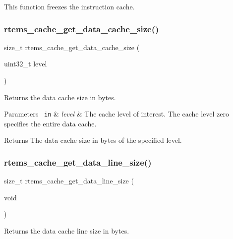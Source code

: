 This function freezes the instruction cache. \mbox{\label{group__ClassicCache_ga518a30758a99000e752ba02f04674749}} 
\subsubsection{\texorpdfstring{rtems\_cache\_get\_data\_cache\_size()}{rtems\_cache\_get\_data\_cache\_size()}}
{\footnotesize\ttfamily size\+\_\+t rtems\+\_\+cache\+\_\+get\+\_\+data\+\_\+cache\+\_\+size (\begin{DoxyParamCaption}\item[{uint32\+\_\+t}]{level }\end{DoxyParamCaption})}



Returns the data cache size in bytes. 


\begin{DoxyParams}[1]{Parameters}
\mbox{\texttt{ in}}  & {\em level} & The cache level of interest. The cache level zero specifies the entire data cache.\\
\hline
\end{DoxyParams}
\begin{DoxyReturn}{Returns}
The data cache size in bytes of the specified level. 
\end{DoxyReturn}
\mbox{\label{group__ClassicCache_gaf4dd0168871b3939eae1541c216eca31}} 
\subsubsection{\texorpdfstring{rtems\_cache\_get\_data\_line\_size()}{rtems\_cache\_get\_data\_line\_size()}}
{\footnotesize\ttfamily size\+\_\+t rtems\+\_\+cache\+\_\+get\+\_\+data\+\_\+line\+\_\+size (\begin{DoxyParamCaption}\item[{void}]{ }\end{DoxyParamCaption})}



Returns the data cache line size in bytes. 


